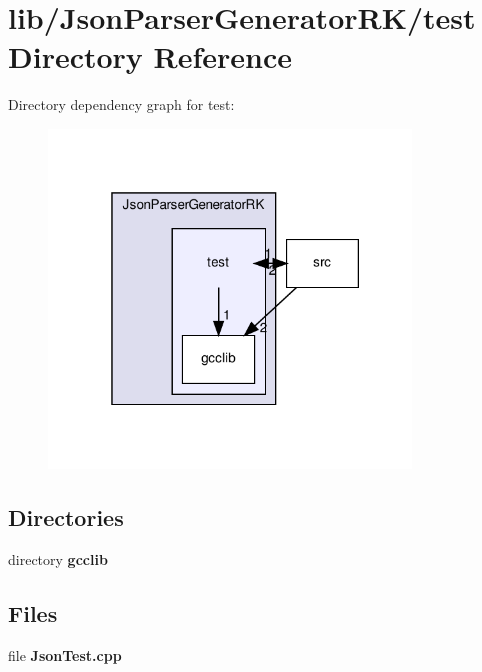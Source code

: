 \section{lib/\+Json\+Parser\+Generator\+R\+K/test Directory Reference}
\label{dir_0a3e9c8d1edbea3a49914df9ac38fef0}
Directory dependency graph for test\+:\nopagebreak
\begin{figure}[H]
\begin{center}
\leavevmode
\includegraphics[width=273pt]{dir_0a3e9c8d1edbea3a49914df9ac38fef0_dep}
\end{center}
\end{figure}
\subsection*{Directories}
\begin{DoxyCompactItemize}
\item 
directory \textbf{ gcclib}
\end{DoxyCompactItemize}
\subsection*{Files}
\begin{DoxyCompactItemize}
\item 
file \textbf{ Json\+Test.\+cpp}
\end{DoxyCompactItemize}
